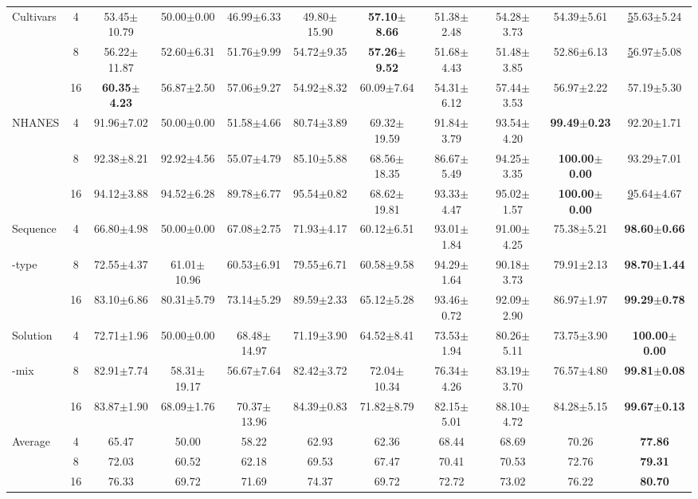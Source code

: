 \documentclass{article}
\theoremstyle{plain}
\theoremstyle{definition}
\theoremstyle{remark}
\begin{document}
\begin{table}[t!]
{\begin{tabular}{@{}l|c|cccccccc|c@{}}
Cultivars & 4 & 53.45$\pm$10.79 & 50.00$\pm$0.00 & 46.99$\pm$6.33 & 49.80$\pm$15.90 & \textbf{57.10$\pm$8.66} & 51.38$\pm$2.48 & 54.28$\pm$3.73 & 54.39$\pm$5.61 & {\ul 55.63$\pm$5.24} \\
 & 8 & 56.22$\pm$11.87 & 52.60$\pm$6.31 & 51.76$\pm$9.99 & 54.72$\pm$9.35 & \textbf{57.26$\pm$9.52} & 51.68$\pm$4.43 & 51.48$\pm$3.85 & 52.86$\pm$6.13 & {\ul 56.97$\pm$5.08} \\
 & 16 & \textbf{60.35$\pm$4.23} & 56.87$\pm$2.50 & 57.06$\pm$9.27 & 54.92$\pm$8.32 & 60.09$\pm$7.64 & 54.31$\pm$6.12 & 57.44$\pm$3.53 & 56.97$\pm$2.22 & 57.19$\pm$5.30 \\ \midrule
NHANES & 4 & 91.96$\pm$7.02 & 50.00$\pm$0.00 & 51.58$\pm$4.66 & 80.74$\pm$3.89 & 69.32$\pm$19.59 & 91.84$\pm$3.79 & 93.54$\pm$4.20 & \textbf{99.49$\pm$0.23} & 92.20$\pm$1.71 \\
 & 8 & 92.38$\pm$8.21 & 92.92$\pm$4.56 & 55.07$\pm$4.79 & 85.10$\pm$5.88 & 68.56$\pm$18.35 & 86.67$\pm$5.49 & 94.25$\pm$3.35 & \textbf{100.00$\pm$0.00} & 93.29$\pm$7.01 \\
 & 16 & 94.12$\pm$3.88 & 94.52$\pm$6.28 & 89.78$\pm$6.77 & 95.54$\pm$0.82 & 68.62$\pm$19.81 & 93.33$\pm$4.47 & 95.02$\pm$1.57 & \textbf{100.00$\pm$0.00} & {\ul 95.64$\pm$4.67} \\ \midrule
Sequence & 4 & 66.80$\pm$4.98 & 50.00$\pm$0.00 & 67.08$\pm$2.75 & 71.93$\pm$4.17 & 60.12$\pm$6.51 & 93.01$\pm$1.84 & 91.00$\pm$4.25 & 75.38$\pm$5.21 & \textbf{98.60$\pm$0.66} \\
-type & 8 & 72.55$\pm$4.37 & 61.01$\pm$10.96 & 60.53$\pm$6.91 & 79.55$\pm$6.71 & 60.58$\pm$9.58 & 94.29$\pm$1.64 & 90.18$\pm$3.73 & 79.91$\pm$2.13 & \textbf{98.70$\pm$1.44} \\
 & 16 & 83.10$\pm$6.86 & 80.31$\pm$5.79 & 73.14$\pm$5.29 & 89.59$\pm$2.33 & 65.12$\pm$5.28 & 93.46$\pm$0.72 & 92.09$\pm$2.90 & 86.97$\pm$1.97 & \textbf{99.29$\pm$0.78} \\ \midrule
Solution & 4 & 72.71$\pm$1.96 & 50.00$\pm$0.00 & 68.48$\pm$14.97 & 71.19$\pm$3.90 & 64.52$\pm$8.41 & 73.53$\pm$1.94 & 80.26$\pm$5.11 & 73.75$\pm$3.90 & \textbf{100.00$\pm$0.00} \\
-mix & 8 & 82.91$\pm$7.74 & 58.31$\pm$19.17 & 56.67$\pm$7.64 & 82.42$\pm$3.72 & 72.04$\pm$10.34 & 76.34$\pm$4.26 & 83.19$\pm$3.70 & 76.57$\pm$4.80 & \textbf{99.81$\pm$0.08} \\
 & 16 & 83.87$\pm$1.90 & 68.09$\pm$1.76 & 70.37$\pm$13.96 & 84.39$\pm$0.83 & 71.82$\pm$8.79 & 82.15$\pm$5.01 & 88.10$\pm$4.72 & 84.28$\pm$5.15 & \textbf{99.67$\pm$0.13} \\ \midrule
Average & 4 & 65.47 & 50.00 & 58.22 & 62.93 & 62.36 & 68.44 & 68.69 & 70.26 & \textbf{77.86} \\
 & 8 & 72.03 & 60.52 & 62.18 & 69.53 & 67.47 & 70.41 & 70.53 & 72.76 & \textbf{79.31} \\
 & 16 & 76.33 & 69.72 & 71.69 & 74.37 & 69.72 & 72.72 & 73.02 & 76.22 & \textbf{80.70} \\ \bottomrule
\end{tabular}}
\label{tab:main1}
\end{table}
\end{document}
